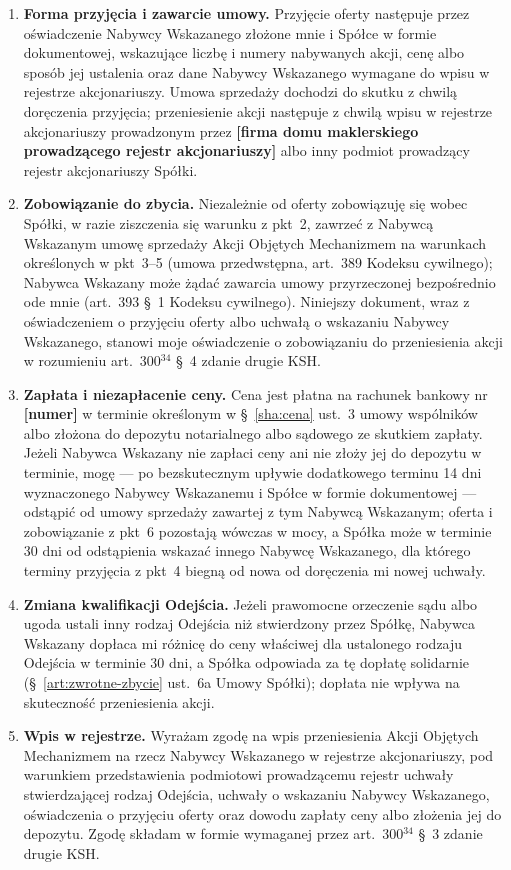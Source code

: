 \documentclass[12pt,a4paper]{report}
\newcommand{\field}[1]{\textbf{[#1]}}
\begin{document}
\begin{enumerate}
  \item \textbf{Forma przyjęcia i zawarcie umowy.} Przyjęcie oferty następuje przez oświadczenie Nabywcy Wskazanego złożone mnie i Spółce w formie dokumentowej, wskazujące liczbę i numery nabywanych akcji, cenę albo sposób jej ustalenia oraz dane Nabywcy Wskazanego wymagane do wpisu w rejestrze akcjonariuszy. Umowa sprzedaży dochodzi do skutku z chwilą doręczenia przyjęcia; przeniesienie akcji następuje z chwilą wpisu w rejestrze akcjonariuszy prowadzonym przez \field{firma domu maklerskiego prowadzącego rejestr akcjonariuszy} albo inny podmiot prowadzący rejestr akcjonariuszy Spółki.
  \item \textbf{Zobowiązanie do zbycia.} Niezależnie od oferty zobowiązuję się wobec Spółki, w razie ziszczenia się warunku z pkt~2, zawrzeć z Nabywcą Wskazanym umowę sprzedaży Akcji Objętych Mechanizmem na warunkach określonych w pkt~3--5 (umowa przedwstępna, art.~389 Kodeksu cywilnego); Nabywca Wskazany może żądać zawarcia umowy przyrzeczonej bezpośrednio ode mnie (art.~393 §~1 Kodeksu cywilnego). Niniejszy dokument, wraz z oświadczeniem o przyjęciu oferty albo uchwałą o wskazaniu Nabywcy Wskazanego, stanowi moje oświadczenie o zobowiązaniu do przeniesienia akcji w rozumieniu art.~300$^{34}$ §~4 zdanie drugie KSH.
  \item \textbf{Zapłata i niezapłacenie ceny.} Cena jest płatna na rachunek bankowy nr \field{numer} w terminie określonym w §~\ref{sha:cena} ust.~3 umowy wspólników albo złożona do depozytu notarialnego albo sądowego ze skutkiem zapłaty. Jeżeli Nabywca Wskazany nie zapłaci ceny ani nie złoży jej do depozytu w terminie, mogę --- po bezskutecznym upływie dodatkowego terminu 14 dni wyznaczonego Nabywcy Wskazanemu i Spółce w formie dokumentowej --- odstąpić od umowy sprzedaży zawartej z tym Nabywcą Wskazanym; oferta i zobowiązanie z pkt~6 pozostają wówczas w mocy, a Spółka może w terminie 30 dni od odstąpienia wskazać innego Nabywcę Wskazanego, dla którego terminy przyjęcia z pkt~4 biegną od nowa od doręczenia mi nowej uchwały.
  \item \textbf{Zmiana kwalifikacji Odejścia.} Jeżeli prawomocne orzeczenie sądu albo ugoda ustali inny rodzaj Odejścia niż stwierdzony przez Spółkę, Nabywca Wskazany dopłaca mi różnicę do ceny właściwej dla ustalonego rodzaju Odejścia w terminie 30 dni, a Spółka odpowiada za tę dopłatę solidarnie (§~\ref{art:zwrotne-zbycie} ust.~6a Umowy Spółki); dopłata nie wpływa na skuteczność przeniesienia akcji.
  \item \textbf{Wpis w rejestrze.} Wyrażam zgodę na wpis przeniesienia Akcji Objętych Mechanizmem na rzecz Nabywcy Wskazanego w rejestrze akcjonariuszy, pod warunkiem przedstawienia podmiotowi prowadzącemu rejestr uchwały stwierdzającej rodzaj Odejścia, uchwały o wskazaniu Nabywcy Wskazanego, oświadczenia o przyjęciu oferty oraz dowodu zapłaty ceny albo złożenia jej do depozytu. Zgodę składam w formie wymaganej przez art.~300$^{34}$ §~3 zdanie drugie KSH.

\end{enumerate}
\end{document}
